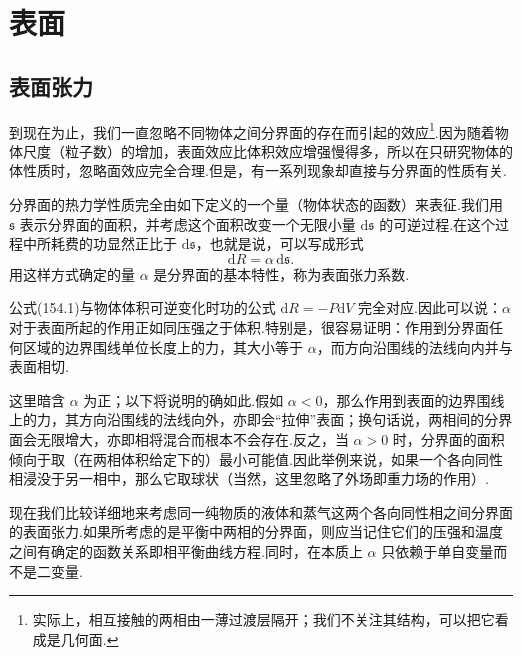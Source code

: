 \chapter{表面}

\section{表面张力}

到现在为止，我们一直忽略不同物体之间分界面的存在而引起的效应\footnote{实际上，相互接触的两相由一薄过渡层隔开；我们不关注其结构，可以把它看成是几何面.}.因为随着物体尺度（粒子数）的增加，表面效应比体积效应增强慢得多，所以在只研究物体的体性质时，忽略面效应完全合理.但是，有一系列现象却直接与分界面的性质有关.

分界面的热力学性质完全由如下定义的一个量（物体状态的函数）来表征.我们用 $\mathfrak{s}$ 表示分界面的面积，并考虑这个面积改变一个无限小量 $\mathrm{d}\mathfrak{s}$ 的可逆过程.在这个过程中所耗费的功显然正比于 $\mathrm{d}\mathfrak{s}$，也就是说，可以写成形式
\begin{equation}
  \mathrm{d}R=\alpha\,\mathrm{d}\mathfrak{s}.
\end{equation}
用这样方式确定的量 $\alpha$ 是分界面的基本特性，称为表面张力系数.

公式(154.1)与物体体积可逆变化时功的公式 $\mathrm{d}R=-P\mathrm{d}V$ 完全对应.因此可以说：$\alpha$ 对于表面所起的作用正如同压强之于体积.特别是，很容易证明：作用到分界面任何区域的边界围线单位长度上的力，其大小等于 $\alpha$，而方向沿围线的法线向内并与表面相切.

这里暗含 $\alpha$ 为正；以下将说明的确如此.假如 $\alpha<0$，那么作用到表面的边界围线上的力，其方向沿围线的法线向外，亦即会“拉伸”表面；换句话说，两相间的分界面会无限增大，亦即相将混合而根本不会存在.反之，当 $\alpha>0$ 时，分界面的面积倾向于取（在两相体积给定下的）最小可能值.因此举例来说，如果一个各向同性相浸没于另一相中，那么它取球状（当然，这里忽略了外场即重力场的作用）.

现在我们比较详细地来考虑同一纯物质的液体和蒸气这两个各向同性相之间分界面的表面张力.如果所考虑的是平衡中两相的分界面，则应当记住它们的压强和温度之间有确定的函数关系即相平衡曲线方程.同时，在本质上 $\alpha$ 只依赖于单自变量而不是二变量.

